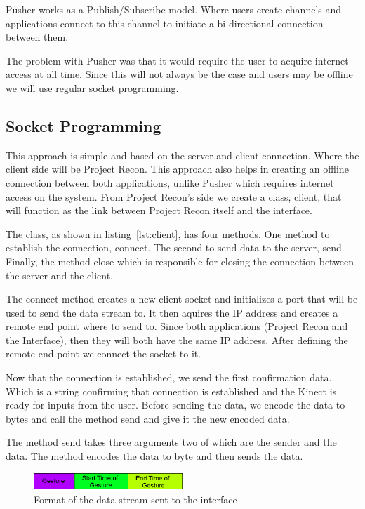 Pusher works as a Publish/Subscribe model. Where users create channels and applications connect to this channel to initiate a bi-directional connection between them.

The problem with Pusher was that it would require the user to acquire internet access at all time. Since this will not always be the case and users may be offline we will use regular socket programming.
\subsection{Socket Programming}
This approach is simple and based on the server and client connection. Where the client side will be Project Recon. This approach also helps in creating an offline connection between both applications, unlike Pusher which requires internet access on the system. From Project Recon's side we create a class, client, that will function as the link between Project Recon itself and the interface.

The class, as shown in listing~\ref{lst:client}, has four methods. One method to establish the connection, connect. The second to send data to the server, send. Finally, the method close which is responsible for closing the connection between the server and the client.



The connect method creates a new client socket and initializes a port that will be used to send the data stream to. It then aquires the IP address and creates a remote end point where to send to. Since both applications (Project Recon and the Interface), then they will both have the same IP address. After defining the remote end point we connect the socket to it.

Now that the connection is established, we send the first confirmation data. Which is a string confirming that connection is established and the Kinect is ready for inputs from the user. Before sending the data, we encode the data to bytes and call the method send and give it the new encoded data.

The method send takes three arguments two of which are the sender and the data. The method encodes the data to byte and then sends the data.

\begin{figure}[!htbp]
\centering
\includegraphics[width=0.5\textwidth]{images/format.png}
\caption{Format of the data stream sent to the interface}
\label{format}
\end{figure}

